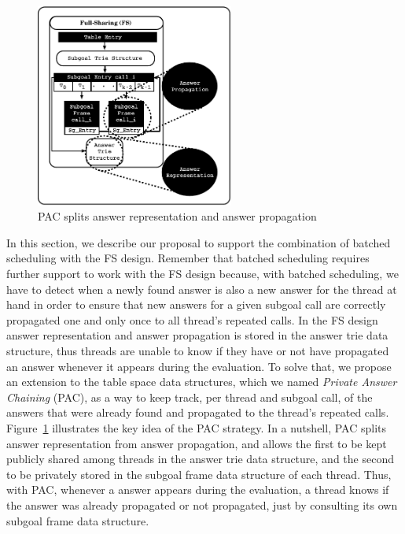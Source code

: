 \documentclass{llncs}
\begin{document}
\begin{figure}
\vspace{-\intextsep}
\centering
\includegraphics[width=6.5cm]{figures/pcc_key-idea.pdf}
\caption{PAC splits answer representation and answer propagation}
\label{fig_tabtries_pcc_key-idea}
\vspace{-0.5\intextsep}
\end{figure}


In this section, we describe our proposal to support the combination
of batched scheduling with the FS design. Remember that batched
scheduling requires further support to work with the FS design
because, with batched scheduling, we have to detect when a newly found
answer is also a new answer for the thread at hand in order to ensure
that new answers for a given subgoal call are correctly propagated one
and only once to all thread’s repeated calls. In the FS design answer
representation and answer propagation is stored in the answer trie
data structure, thus threads are unable to know if they have or not
have propagated an answer whenever it appears during the
evaluation. To solve that, we propose an extension to the table space
data structures, which we named \emph{Private Answer Chaining} (PAC),
as a way to keep track, per thread and subgoal call, of the answers
that were already found and propagated to the thread's repeated
calls. Figure~\ref{fig_tabtries_pcc_key-idea} illustrates the key idea
of the PAC strategy. In a nutshell, PAC splits answer representation
from answer propagation, and allows the first to be kept publicly
shared among threads in the answer trie data structure, and the second
to be privately stored in the subgoal frame data structure of each
thread. Thus, with PAC, whenever a answer appears during the
evaluation, a thread knows if the answer was already propagated or not
propagated, just by consulting its own subgoal frame data structure.
\end{document}
